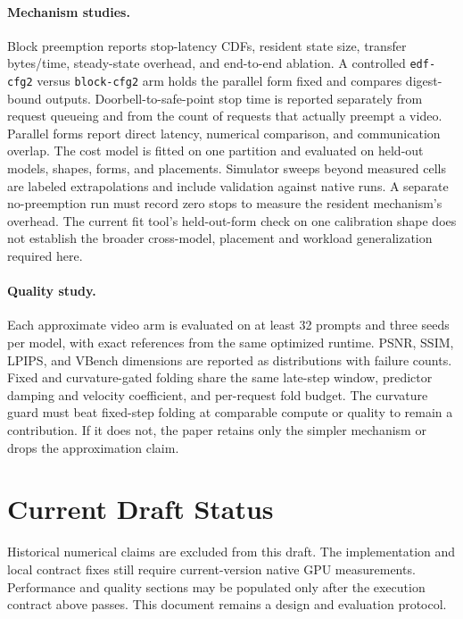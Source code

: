 \documentclass[11pt,a4paper]{article}
\begin{document}
\paragraph{Mechanism studies.}
Block preemption reports stop-latency CDFs, resident state size, transfer
bytes/time, steady-state overhead, and end-to-end ablation. A controlled
\texttt{edf-cfg2} versus \texttt{block-cfg2} arm holds the parallel form
fixed and compares digest-bound outputs. Doorbell-to-safe-point stop time is
reported separately from request queueing and from the count of requests that
actually preempt a video. Parallel forms report direct latency, numerical
comparison, and communication overlap. The cost model is fitted on one
partition and evaluated on held-out models, shapes, forms, and placements.
Simulator sweeps beyond measured cells are labeled extrapolations and include
validation against native runs. A separate no-preemption run must record zero
stops to measure the resident mechanism's overhead. The current fit tool's
held-out-form check on one calibration shape does not establish the broader
cross-model, placement and workload generalization required here.

\paragraph{Quality study.}
Each approximate video arm is evaluated on at least 32 prompts and three
seeds per model, with exact references from the same optimized runtime.
PSNR, SSIM, LPIPS, and VBench dimensions are reported as distributions with
failure counts. Fixed and curvature-gated folding share the same late-step
window, predictor damping and velocity coefficient, and per-request fold
budget. The curvature guard must beat fixed-step folding at comparable
compute or quality to remain a contribution. If it does not, the paper retains
only the simpler mechanism or drops the approximation claim.

\section{Current Draft Status}
Historical numerical claims are excluded from this draft. The implementation
and local contract fixes still require current-version native GPU measurements.
Performance and quality sections may be populated only after the execution
contract above passes. This document remains a design and evaluation protocol.



\end{document}
